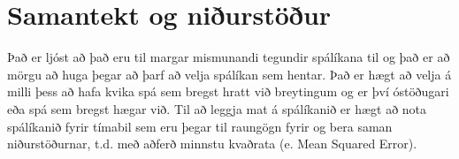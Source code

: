 \section {Samantekt og niðurstöður}

Það er ljóst að það eru til margar mismunandi tegundir spálíkana til og það er að mörgu að huga þegar að þarf að velja spálíkan sem hentar. Það er hægt að velja á milli þess að hafa kvika spá sem bregst hratt við breytingum og er því óstöðugari eða spá sem bregst hægar við. Til að leggja mat á spálíkanið er hægt að nota spálíkanið fyrir tímabil sem eru þegar til raungögn fyrir og bera saman niðurstöðurnar, t.d. með aðferð minnstu kvaðrata (e. Mean Squared Error).